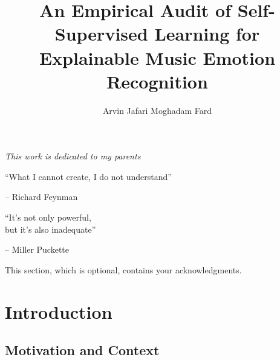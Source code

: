 \documentclass[12pt]{report}
\title{An Empirical Audit of Self-Supervised Learning for Explainable Music Emotion Recognition}
\author{Arvin Jafari Moghadam Fard}
\begin{document}
\makefrontpage

% 
%

{\raggedleft \large \sl This work is dedicated to my parents\\
	
	\vspace{2cm}
	
	``What I cannot create, I do not understand''
	
	\bigskip
	
	\--- Richard Feynman\\
  
	\vspace{2cm}
	
	``It's not only powerful,\\but it's also inadequate''
	
	\bigskip
	
	\--- Miller Puckette\\}

\clearpage
\beforepreface

% 
%


%
%

This section, which is optional, contains your acknowledgments.

%
%

\afterpreface

% 
% 

\chapter{Introduction}
\label{ch:introduction}

\section{Motivation and Context}
\end{document}
